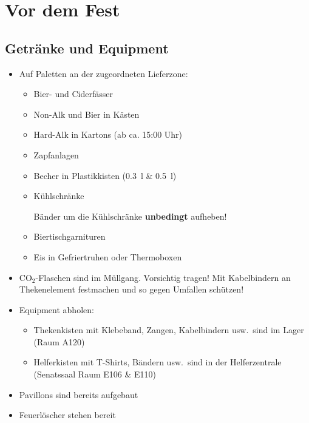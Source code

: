 \section{Vor dem Fest}
\subsection{Getränke und Equipment}
\begin{itemize}
  \item Auf Paletten an der zugeordneten Lieferzone:
    \begin{itemize}
      \item Bier- und Ciderfässer
      \item Non-Alk und Bier in Kästen
      \item Hard-Alk in Kartons (ab ca. 15:00 Uhr)
      \item Zapfanlagen
      \item Becher in Plastikkisten (\SI{0.3}{\litre} \& \SI{0.5}{\litre})
      \item Kühlschränke

        Bänder um die Kühlschränke \textbf{unbedingt} aufheben!
      \item Biertischgarnituren
      \item Eis in Gefriertruhen oder Thermoboxen
    \end{itemize}
  \item CO$_2$-Flaschen sind im Müllgang. Vorsichtig tragen! Mit Kabelbindern an Thekenelement festmachen und so gegen Umfallen schützen!
  \item Equipment abholen:
    \begin{itemize}
      \item Thekenkisten mit Klebeband, Zangen, Kabelbindern usw.\ sind im Lager (Raum A120)
      \item Helferkisten mit T-Shirts, Bändern usw.\ sind in der Helferzentrale (Senatssaal Raum E106 \& E110)
    \end{itemize}
  \item Pavillons sind bereits aufgebaut
  \item Feuerlöscher stehen bereit
\end{itemize}
